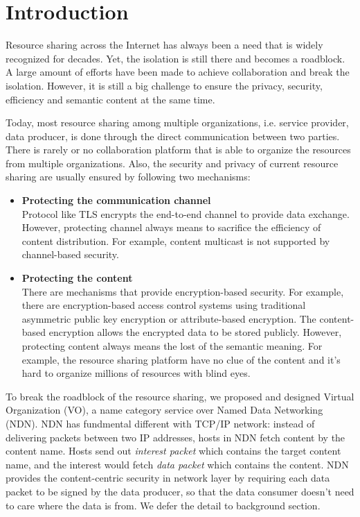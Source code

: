 \section{Introduction}

Resource sharing across the Internet has always been a need that is widely recognized for decades.
Yet, the isolation is still there and becomes a roadblock.
A large amount of efforts have been made to achieve collaboration and break the isolation.
However, it is still a big challenge to ensure the privacy, security, efficiency and semantic content at the same time.

Today, most resource sharing among multiple organizations, i.e. service provider, data producer, is done through the direct communication between two parties.
There is rarely or no collaboration platform that is able to organize the resources from multiple organizations.
Also, the security and privacy of current resource sharing are usually ensured by following two mechanisms:
\begin{itemize}
\item \textbf{Protecting the communication channel} \\
Protocol like TLS encrypts the end-to-end channel to provide data exchange.
However, protecting channel always means to sacrifice the efficiency of content distribution.
For example, content multicast is not supported by channel-based security.
\item \textbf{Protecting the content} \\
There are mechanisms that provide encryption-based security.
For example, there are encryption-based access control systems using traditional asymmetric public key encryption or attribute-based encryption.
The content-based encryption allows the encrypted data to be stored publicly.
However, protecting content always means the lost of the semantic meaning.
For example, the resource sharing platform have no clue of the content and it's hard to organize millions of resources with blind eyes.
\end{itemize}

To break the roadblock of the resource sharing, we proposed and designed Virtual Organization (VO), a name category service over Named Data Networking (NDN).
NDN has fundmental different with TCP/IP network: instead of delivering packets between two IP addresses, hosts in NDN fetch content by the content name.
Hosts send out \textit{interest packet} which contains the target content name, and the interest would fetch \textit{data packet} which contains the content.
NDN provides the content-centric security in network layer by requiring each data packet to be signed by the data producer, so that the data consumer doesn't need to care where the data is from.
We defer the detail to background section.

